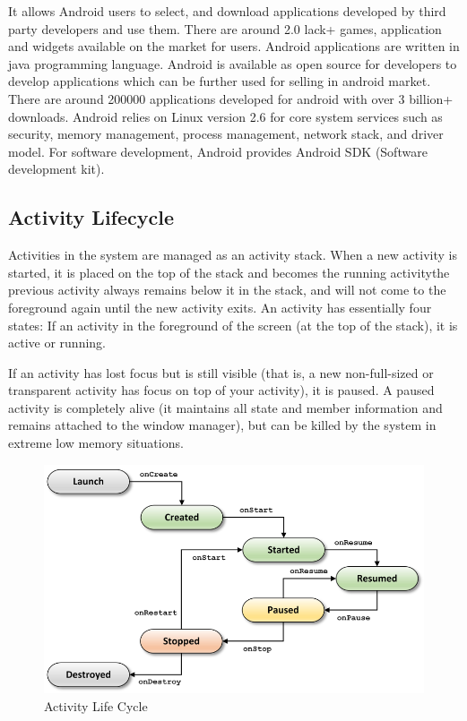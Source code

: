  It allows Android users to select, and
download applications developed by third party developers and use them. There
are around 2.0 lack+ games, application and widgets available on the market for
users. Android applications are written in java programming language. Android is
available as open source for developers to develop applications which can be
further used for selling in android market. There are around 200000 applications
developed for android with over 3 billion+ downloads. Android relies on Linux version 2.6 for core system services such as security, memory management, process management, network stack, and driver model. For software development, Android provides Android SDK (Software development kit).

\subsection{Activity Lifecycle}
Activities in the system are managed as an activity stack. When a new activity
is started, it is placed on the top of the stack and becomes the running activitythe previous activity always remains below it in the stack, and will not come to
the foreground again until the new activity exits. An activity has essentially four
states:
If an activity in the foreground of the screen (at the top of the stack), it is
active or running.

If an activity has lost focus but is still visible (that is, a new non-full-sized or
transparent activity has focus on top of your activity), it is paused. A paused
activity is completely alive (it maintains all state and member information and
remains attached to the window manager), but can be killed by the system in
extreme low memory situations.
\begin{figure}[ht]
\centering
\includegraphics[scale=0.5]{images/a2.png}
\caption{Activity Life Cycle}
\label{fig: Activity }
\end{figure}

